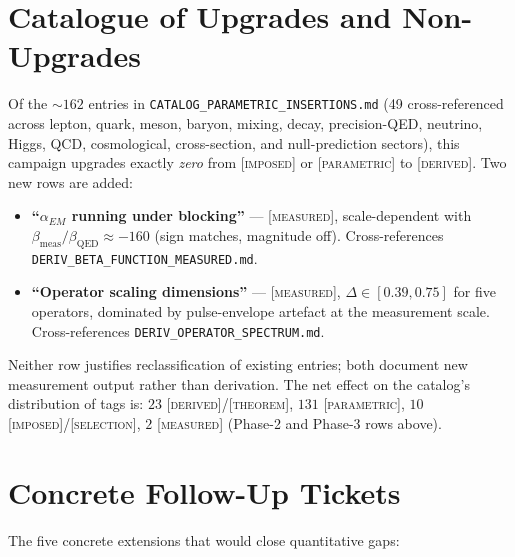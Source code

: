 \documentclass[11pt,letterpaper]{article}
\begin{document}
\section{Catalogue of Upgrades and Non-Upgrades}
\label{sec:catalog}

Of the $\sim 162$ entries in
\texttt{CATALOG\_PARAMETRIC\_INSERTIONS.md} (49 cross-referenced across
lepton, quark, meson, baryon, mixing, decay, precision-QED, neutrino,
Higgs, QCD, cosmological, cross-section, and null-prediction sectors),
this campaign upgrades exactly \emph{zero} from [\textsc{imposed}] or
[\textsc{parametric}] to [\textsc{derived}]. Two new rows are added:

\begin{itemize}
  \item \textbf{``$\alpha_{EM}$ running under blocking''} ---
    [\textsc{measured}], scale-dependent with
    $\beta_{\mathrm{meas}}/\beta_{\mathrm{QED}} \approx -160$
    (sign matches, magnitude off). Cross-references
    \texttt{DERIV\_BETA\_FUNCTION\_MEASURED.md}.
  \item \textbf{``Operator scaling dimensions''} --- [\textsc{measured}],
    $\Delta \in [0.39, 0.75]$ for five operators, dominated by
    pulse-envelope artefact at the measurement scale. Cross-references
    \texttt{DERIV\_OPERATOR\_SPECTRUM.md}.
\end{itemize}

Neither row justifies reclassification of existing entries; both document
new measurement output rather than derivation. The net effect on the
catalog's distribution of tags is: $23$ [\textsc{derived}]/[\textsc{theorem}],
$131$ [\textsc{parametric}], $10$ [\textsc{imposed}]/[\textsc{selection}], $2$
[\textsc{measured}] (Phase-2 and Phase-3 rows above).

\section{Concrete Follow-Up Tickets}
\label{sec:followup}

The five concrete extensions that would close quantitative gaps:
\end{document}
